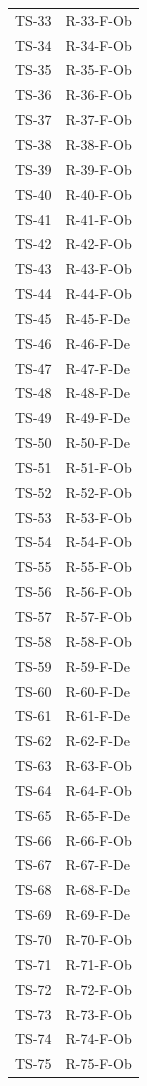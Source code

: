 \documentclass[a4paper, 11pt]{article}
\begin{document}
\begin{longtable}{>{\centering\arraybackslash}m{2.5cm} >{\centering\arraybackslash}m{3.5cm}}
TS-33 & R-33-F-Ob \\
TS-34 & R-34-F-Ob \\
TS-35 & R-35-F-Ob \\
TS-36 & R-36-F-Ob \\
TS-37 & R-37-F-Ob \\
TS-38 & R-38-F-Ob \\
TS-39 & R-39-F-Ob \\
TS-40 & R-40-F-Ob \\
TS-41 & R-41-F-Ob \\
TS-42 & R-42-F-Ob \\
TS-43 & R-43-F-Ob \\
TS-44 & R-44-F-Ob \\
TS-45 & R-45-F-De \\
TS-46 & R-46-F-De \\
TS-47 & R-47-F-De \\
TS-48 & R-48-F-De \\
TS-49 & R-49-F-De \\
TS-50 & R-50-F-De \\
TS-51 & R-51-F-Ob \\
TS-52 & R-52-F-Ob \\
TS-53 & R-53-F-Ob \\
TS-54 & R-54-F-Ob \\
TS-55 & R-55-F-Ob \\
TS-56 & R-56-F-Ob \\
TS-57 & R-57-F-Ob \\
TS-58 & R-58-F-Ob \\
TS-59 & R-59-F-De \\
TS-60 & R-60-F-De \\
TS-61 & R-61-F-De \\
TS-62 & R-62-F-De \\
TS-63 & R-63-F-Ob \\
TS-64 & R-64-F-Ob \\
TS-65 & R-65-F-De \\
TS-66 & R-66-F-Ob \\
TS-67 & R-67-F-De \\
TS-68 & R-68-F-De \\
TS-69 & R-69-F-De \\
TS-70 & R-70-F-Ob \\
TS-71 & R-71-F-Ob \\
TS-72 & R-72-F-Ob \\
TS-73 & R-73-F-Ob \\
TS-74 & R-74-F-Ob \\
TS-75 & R-75-F-Ob \\

\end{longtable}
\end{document}
